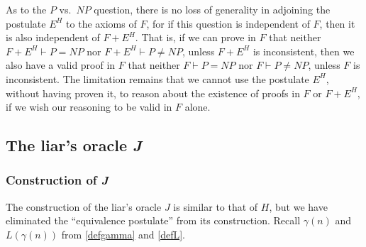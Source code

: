 \documentclass[letterpaper]{article}
\newcommand{\Construction}{{\large\dsmathematical}}
\begin{document}
\begin{remark}
As to the $P$ vs.\ $NP$ question, there is no loss of generality in adjoining the postulate $E^H$ to the axioms of $F$, for if this question is independent of $F$, then it is also independent of $F+E^H$. That is, if we can prove in $F$ that neither  $F+E^H\vdash P=NP$ nor $F+E^H\vdash P\ne NP$, unless $F+E^H$ is inconsistent, then we also have a valid proof in $F$ that neither $F\vdash P=NP$ nor $F\vdash P\ne NP$, unless $F$ is inconsistent.  The limitation remains that we cannot use the postulate $E^H$, without having proven it, to reason about the existence of proofs in $F$ or $F+E^H$, if we wish our reasoning to be valid in $F$ alone.
\end{remark}

\subsection{The liar's oracle \textit{J}}
\subsubsection{Construction of \textit{J}}
The construction of the liar's oracle $J$ is similar to that of $H$, but we have eliminated the ``equivalence postulate'' from its construction.
Recall $\gamma(n)$ and $L(\gamma(n))$ from \Construction\Construction \ref{defgamma} and \ref{defL}.
\end{document}

